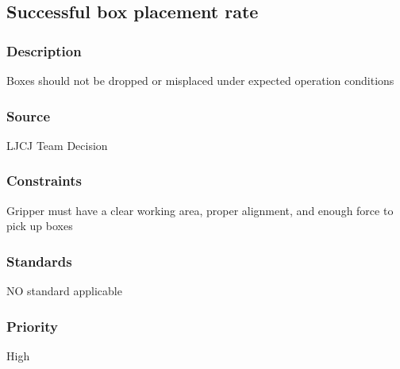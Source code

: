 \subsection{Successful box placement rate}
\subsubsection{Description}
Boxes should not be dropped or misplaced under expected operation conditions
\subsubsection{Source}
LJCJ Team Decision
\subsubsection{Constraints}
Gripper must have a clear working area, proper alignment, and enough force to pick up boxes
\subsubsection{Standards}
NO standard applicable
\subsubsection{Priority}
High
